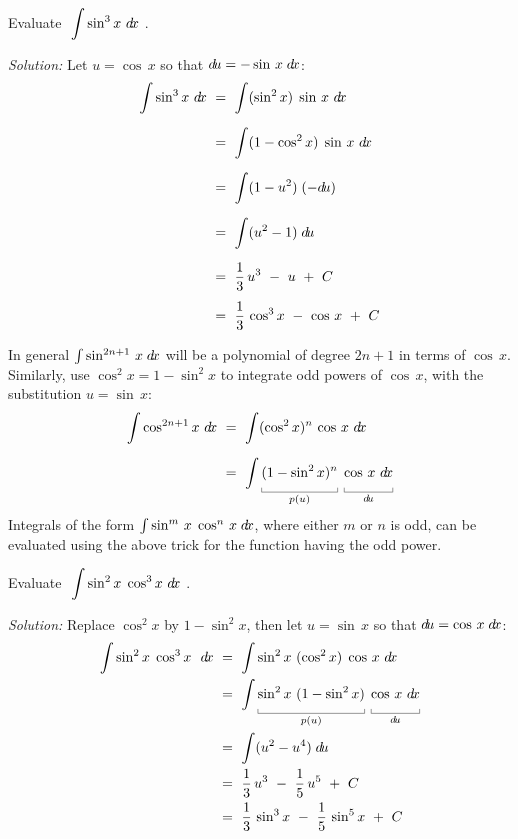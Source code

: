 \begin{exmp}\label{exmp:trigint2}
\noindent Evaluate $~\displaystyle\int \sin^3 x~d\!x~$.\vspace{1mm}
\par\noindent\emph{Solution:} Let $u=\cos\,x$ so that $d\!u=-\sin\,x\;d\!x$:
\begin{align*}
\int \sin^3 x~d\!x ~&=~ \int (\sin^2 x) \;\sin\,x~d\!x\\[6pt]
&=~ \int (1 - \cos^2 x) \;\sin\,x~d\!x\\[6pt]
&=~ \int (1 - u^2)\;(-d\!u)\\[6pt]
&=~ \int (u^2 - 1)\;d\!u\\[6pt]
&=~ \frac{1}{3}\,u^3 ~-~ u ~+~ C\\[4pt]
&=~ \frac{1}{3}\,\cos^3 x ~-~ \cos\,x ~+~ C
\end{align*}
\end{exmp}
\divider
\vspace{2mm}
In general $\int \sin^{2n+1}\,x\;d\!x$ will be a polynomial of degree $2n+1$ in
terms of $\cos\,x$. Similarly, use $\cos^2 x = 1 - \sin^2 x$ to integrate odd
powers of $\cos\,x$, with the substitution $u=\sin\,x$:
\begin{align*}
\int \cos^{2n+1} x~\dx ~&=~ \int (\cos^2 x)^n \,\cos\,x~\dx\\[6pt]
&=~ \int \underbracket[0.3pt]{(1 - \sin^2 x)^n\vphantom{\frac{1}{2}}}_{p(u)}
\;\underbracket[0.3pt]{\cos\,x~\dx\vphantom{\frac{1}{2}}}_{\du}
\end{align*}
\newpage
Integrals of the form $\int \sin^m\,x\;\cos^n\,x\;d\!x$, where either $m$ or
$n$ is odd, can be evaluated using the above trick for the function having the
odd power.
\begin{exmp}\label{exmp:trigint3}
\noindent Evaluate $~\displaystyle\int \sin^2 x\;\cos^3 x~d\!x~$.\vspace{1mm}
\par\noindent\emph{Solution:} Replace $\cos^2 x$ by $1 - \sin^2 x$, then let
$u=\sin\,x$ so that $d\!u=\cos\,x\;d\!x$:
\begin{align*}
\int \sin^2 x\;\cos^3 x~~\dx ~&=~ \int \sin^2 x ~(\cos^2 x) \;\cos\,x~\dx\\
&=~ \int \underbracket[0.3pt]{\sin^2 x ~(1 - \sin^2 x)\vphantom{\frac{1}{2}}}_{p(u)}
    \;\underbracket[0.3pt]{\cos\,x~\dx\vphantom{\frac{1}{2}}}_{\du}\\
&=~ \int (u^2 - u^4)\;\du\\
&=~ \frac{1}{3}\,u^3 ~-~ \frac{1}{5}\,u^5 ~+~ C\\
&=~ \frac{1}{3}\,\sin^3 x ~-~ \frac{1}{5}\,\sin^5 x ~+~ C
\end{align*}
\end{exmp}
